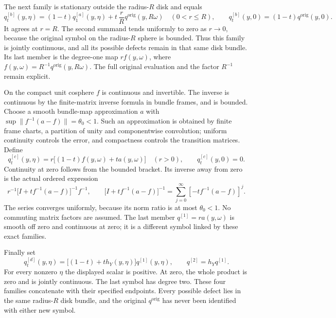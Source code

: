 \documentclass[
  11pt,
]{article}
\begin{document}
The next family is stationary outside the radius-\(R\) disk and equals
\[
 q^{[b]}_t(y,\eta)=
 (1-t)q^{[a]}_1(y,\eta)
       +t\,\frac rR q^{\mathrm{orig}}(y,R\omega)
 \quad(0<r\le R),\qquad
 q^{[b]}_t(y,0)=(1-t)q^{\mathrm{orig}}(y,0).
 \tag{BQ2}
\] It agrees at \(r=R\). The second summand tends uniformly to zero as
\(r\to0\), because the original symbol on the radius-\(R\) sphere is
bounded. Thus this family is jointly continuous, and all its possible
defects remain in that same disk bundle. Its last member is the
degree-one map \(r f(y,\omega)\), where
\(f(y,\omega)=R^{-1}q^{\mathrm{orig}}(y,R\omega)\). The full original
evaluation and the factor \(R^{-1}\) remain explicit.

On the compact unit cosphere \(f\) is continuous and invertible. The
inverse is continuous by the finite-matrix inverse formula in bundle
frames, and is bounded. Choose a smooth bundle-map approximation \(a\)
with \(\sup\|f^{-1}(a-f)\|=\theta_0<1\). Such an approximation is
obtained by finite frame charts, a partition of unity and componentwise
convolution; uniform continuity controls the error, and compactness
controls the transition matrices. Define \[
 q^{[c]}_t(y,\eta)
 =r\bigl[(1-t)f(y,\omega)+t a(y,\omega)\bigr]\quad(r>0),
 \qquad q^{[c]}_t(y,0)=0 .
 \tag{BQ3}
\] Continuity at zero follows from the bounded bracket. Its inverse away
from zero is the actual ordered expression \[
 r^{-1}\bigl[I+t f^{-1}(a-f)\bigr]^{-1}f^{-1},
 \qquad
 \bigl[I+t f^{-1}(a-f)\bigr]^{-1}
 =\sum_{j=0}^\infty[-t f^{-1}(a-f)]^j .
\] The series converges uniformly, because its norm ratio is at most
\(\theta_0<1\). No commuting matrix factors are assumed. The last member
\(q^{[1]}=r a(y,\omega)\) is smooth off zero and continuous at zero; it
is a different symbol linked by these exact families.

Finally set \[
 q^{[d]}_t(y,\eta)=\bigl[(1-t)+t h_Y(y,\eta)\bigr]q^{[1]}(y,\eta),
 \qquad q^{[2]}=h_Y q^{[1]} .
 \tag{BQ4}
\] For every nonzero \(\eta\) the displayed scalar is positive. At zero,
the whole product is zero and is jointly continuous. The last symbol has
degree two. These four families concatenate with their specified
endpoints. Every possible defect lies in the same radius-\(R\) disk
bundle, and the original \(q^{\mathrm{orig}}\) has never been identified
with either new symbol.
\end{document}
